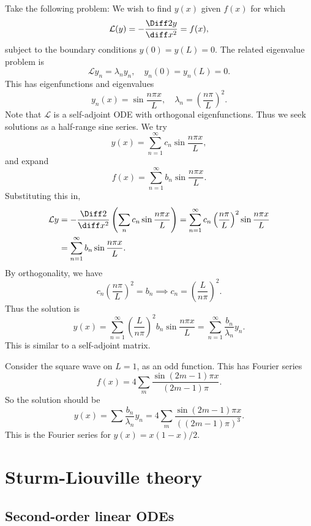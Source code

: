 \documentclass[12pt]{article}
\begin{document}
Take the following problem: We wish to find $y(x)$ given $f(x)$ for which
\[
	\mathcal{L}(y) = - \frac{\Diff2 y}{\diff x^2} = f(x)
,\]
subject to the boundary conditions $y(0) = y(L) = 0$. The related eigenvalue problem is 
\[
	\mathcal{L}y_n = \lambda_n y_n, \quad y_n(0) = y_n(L) = 0
.\]
This has eigenfunctions and eigenvalues
\[
	y_n(x) = \sin \frac{n \pi x}{L}, \quad \lambda_n = \left( \frac{n \pi}{L} \right)^2
.\]
Note that $\mathcal{L}$ is a self-adjoint ODE with orthogonal eigenfunctions. Thus we seek solutions as a half-range sine series. We try
\[
	y(x) = \sum_{n = 1}^{\infty} c_n \sin \frac{n \pi x}{L},
\]
and expand
\[
	f(x) = \sum_{n = 1}^{\infty} b_n \sin \frac{n \pi x}{L}
.\]
Substituting this in,
\begin{align*}
	\mathcal{L}y &= - \frac{\Diff2}{\diff x^2} \left( \sum_{n} c_n \sin \frac{n \pi x}{L} \right) = \sum_{n = 1}^{\infty} c_n \left(\frac{n \pi}{L} \right)^2 \sin \frac{n \pi x}{L} \\
		     &= \sum_{n = 1}^{\infty} b_n \sin \frac{n \pi x}{L}.
\end{align*}
By orthogonality, we have
\[
	c_n \left( \frac{n \pi}{L}\right)^2 = b_n \implies c_n = \left( \frac{L}{n \pi} \right)^2
.\]
Thus the solution is
\[
	y(x) = \sum_{n = 1}^{\infty} \left( \frac{L}{n \pi}\right)^2 b_n \sin \frac{n \pi x}{L} = \sum_{n = 1}^{\infty} \frac{b_n}{\lambda_n} y_n
.\]
This is similar to a self-adjoint matrix.

\begin{exbox}
	Consider the square wave on $L = 1$, as an odd function. This has Fourier series
	\[
		f(x) = 4 \sum_{m} \frac{\sin (2m - 1)\pi x}{(2m - 1)\pi}
	.\]
	So the solution should be
	\[
		y(x) = \sum \frac{b_n}{\lambda_n} y_n = 4 \sum_{m} \frac{\sin (2m - 1)\pi x}{((2m -1)\pi)^3}
	.\]
	This is the Fourier series for $y(x) = x(1-x)/2$.
\end{exbox}

\newpage

\section{Sturm-Liouville theory}%
\label{sec:sturm_liouville_theory}

\subsection{Second-order linear ODEs}%
\label{sub:second_order_linear_odes}
\end{document}
